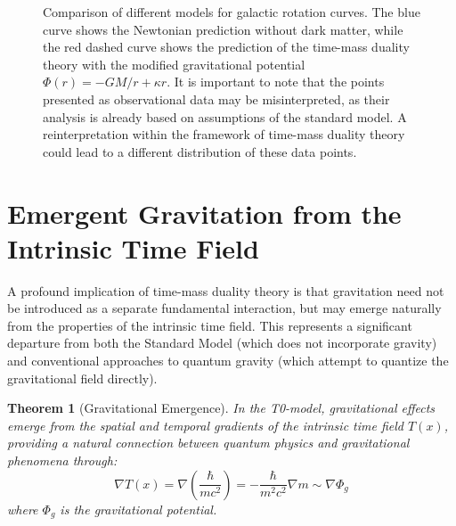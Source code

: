 \documentclass{article}
\newtheorem{theorem}{Theorem}[section]
\theoremstyle{definition}
\theoremstyle{remark}
\newcommand{\Tfield}{T(x)} %
\begin{document}
	\begin{figure}[h]
		\centering
		\caption{Comparison of different models for galactic rotation curves. The blue curve shows the Newtonian prediction without dark matter, while the red dashed curve shows the prediction of the time-mass duality theory with the modified gravitational potential $\Phi(r) = -GM/r + \kappa r$. It is important to note that the points presented as observational data may be misinterpreted, as their analysis is already based on assumptions of the standard model. A reinterpretation within the framework of time-mass duality theory could lead to a different distribution of these data points.}
		

		\label{fig:rotation-curve}
	\end{figure}
\section{Emergent Gravitation from the Intrinsic Time Field}

A profound implication of time-mass duality theory is that gravitation need not be introduced as a separate fundamental interaction, but may emerge naturally from the properties of the intrinsic time field. This represents a significant departure from both the Standard Model (which does not incorporate gravity) and conventional approaches to quantum gravity (which attempt to quantize the gravitational field directly).

\begin{theorem}[Gravitational Emergence]
	In the T0-model, gravitational effects emerge from the spatial and temporal gradients of the intrinsic time field $\Tfield$, providing a natural connection between quantum physics and gravitational phenomena through:
	\begin{equation}
		\nabla \Tfield = \nabla \left(\frac{\hbar}{mc^2}\right) = -\frac{\hbar}{m^2c^2}\nabla m \sim \nabla \Phi_g
	\end{equation}
	where $\Phi_g$ is the gravitational potential.
\end{theorem}
\end{document}
